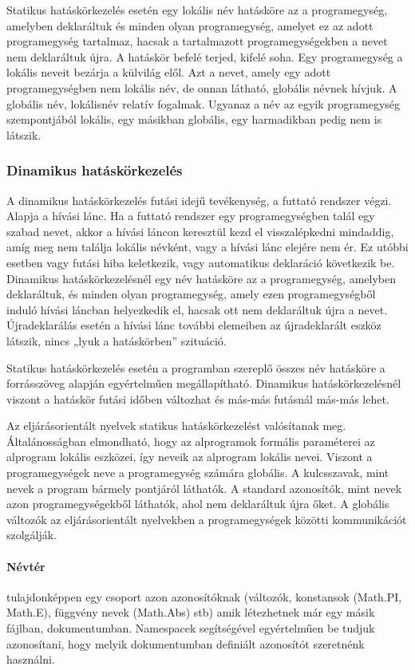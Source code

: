 Statikus hatáskörkezelés esetén egy lokális név hatásköre az a programegység, amelyben deklaráltuk és minden olyan programegység, amelyet ez az adott programegység tartalmaz, hacsak a tartalmazott programegységekben a nevet nem deklaráltuk újra. A hatáskör befelé terjed, kifelé soha. Egy programegység a lokális neveit bezárja a külvilág elől. Azt a nevet, amely egy adott programegységben nem lokális név, de onnan látható, globális névnek hívjuk. A globális név, lokálisnév relatív fogalmak. Ugyanaz a név az egyik programegység szempontjából lokális, egy másikban globális, egy harmadikban pedig nem is látszik.

\subsubsection{Dinamikus hatáskörkezelés}
A dinamikus hatáskörkezelés futási idejű tevékenység, a futtató rendszer végzi. Alapja a hívási lánc. Ha a futtató rendszer egy programegységben talál egy szabad nevet, akkor a hívási láncon keresztül kezd el visszalépkedni mindaddig, amíg meg nem találja lokális névként, vagy a hívási lánc elejére nem ér. Ez utóbbi esetben vagy futási hiba keletkezik, vagy automatikus deklaráció következik be. Dinamikus hatáskörkezelésnél egy név hatásköre az a programegység, amelyben deklaráltuk, és minden olyan programegység, amely ezen programegységből induló hívási láncban helyezkedik el, hacsak ott nem deklaráltuk újra a nevet. Újradeklarálás esetén a hívási lánc további elemeiben az újradeklarált eszköz látszik, nincs „lyuk a hatáskörben” szituáció.

Statikus hatáskörkezelés esetén a programban szereplő összes név hatásköre a forrásszöveg alapján egyértelműen megállapítható. Dinamikus hatáskörkezelésnél viszont a hatáskör futási időben változhat és más-más futásnál más-más lehet.

Az eljárásorientált nyelvek statikus hatáskörkezelést valósítanak meg. Általánosságban elmondható, hogy az alprogramok formális paraméterei az alprogram lokális eszközei, így neveik az alprogram lokális nevei. Viszont a programegységek neve a programegység számára globális. A kulcsszavak, mint nevek a program bármely pontjáról láthatók. A standard azonosítók, mint nevek azon programegységekből láthatók, ahol nem deklaráltuk újra őket. A globális változók az eljárásorientált nyelvekben a programegységek közötti kommunikációt szolgálják.

\paragraph{Névtér} tulajdonképpen egy csoport azon azonosítóknak (változók, konstansok (Math.PI, Math.E), függvény nevek (Math.Abs) stb) amik létezhetnek már egy másik fájlban, dokumentumban. Namespacek segítségével egyértelműen be tudjuk azonosítani, hogy melyik dokumentumban definiált azonosítót szeretnénk használni.

